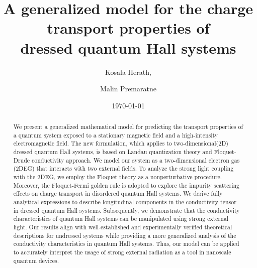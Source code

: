\documentclass[
 reprint,
 amsmath,amssymb,
 aps,
 prb,
]{revtex4-2}
\begin{document}

\title{A generalized model for the charge transport properties of
\\dressed quantum Hall systems}

\author{Kosala Herath,}
\author{Malin Premaratne}

\date{\today}

\begin{abstract}
We present a generalized mathematical model for predicting the transport properties of a quantum system exposed to a stationary magnetic field and a high-intensity electromagnetic field.
The new formulation, which applies to two-dimensional(2D) dressed quantum Hall systems, is based on Landau quantization theory and Floquet-Drude conductivity approach.
We model our system as a two-dimensional electron gas (2DEG) that interacts with two external fields. To analyze the strong light coupling with the 2DEG, we employ the Floquet theory as a nonperturbative procedure.
Moreover, the Floquet-Fermi golden rule is adopted to explore the impurity scattering effects on charge transport in disordered quantum Hall systems.
We derive fully analytical expressions to describe longitudinal components in the conductivity tensor in dressed quantum Hall systems.
Subsequently, we demonstrate that the conductivity characteristics of quantum Hall systems can be manipulated using strong external light.
Our results align with well-established and experimentally
verified theoretical descriptions for undressed systems while providing a more generalized analysis of the conductivity characteristics in quantum Hall systems.
Thus, our model can be applied to accurately interpret the usage of strong external radiation as a tool in nanoscale quantum devices.
\end{abstract}
\end{document}
